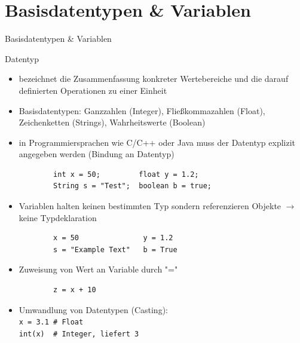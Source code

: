 \documentclass[utf8, smaller, c]{beamer}
\begin{document}
\section{Basisdatentypen \& Variablen}
\begin{frame}{Basisdatentypen \& Variablen}
	\begin{block}{Datentyp}
		\begin{itemize}
			\item bezeichnet die Zusammenfassung konkreter Wertebereiche und die darauf definierten
			Operationen zu einer Einheit
			\item Basisdatentypen: Ganzzahlen (Integer), Fließkommazahlen (Float), Zeichenketten (Strings), Wahrheitswerte (Boolean)
		\end{itemize}
	\end{block}
	\vspace{2mm}
	\begin{itemize}
		\item in Programmiersprachen wie C/C++ oder Java muss der Datentyp explizit angegeben werden (Bindung an Datentyp)
		\begin{verbatim}
		int x = 50;         float y = 1.2;
		String s = "Test";  boolean b = true;
		\end{verbatim}
	\end{itemize}

	\pagebreak
	
	\vspace*{-2mm}
	\begin{itemize}
		\item Variablen halten keinen bestimmten Typ sondern referenzieren Objekte $\rightarrow$ keine Typdeklaration
		\begin{verbatim}
		x = 50               y = 1.2
		s = "Example Text"   b = True
		\end{verbatim}
		\item Zuweisung von Wert an Variable durch "="
		\begin{verbatim}		
		z = x + 10 
		\end{verbatim}
		\item Umwandlung von Datentypen (Casting): \\ \verb+x = 3.1 # Float+ \\ \verb+int(x)  # Integer, liefert 3+
	\end{itemize}
	
	\pagebreak	
	

\end{frame}
\end{document}
